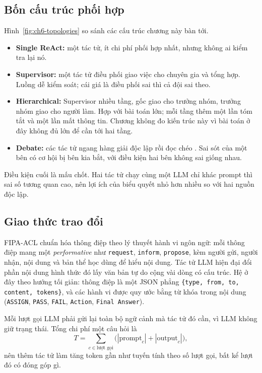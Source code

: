 \subsection{Bốn cấu trúc phối hợp}
Hình~\ref{fig:ch6-topologies} so sánh các cấu trúc chương này bàn tới.
\begin{itemize}
\item \textbf{Single ReAct:} một tác tử, ít chi phí phối hợp nhất, nhưng không ai kiểm tra lại nó.
\item \textbf{Supervisor:} một tác tử điều phối giao việc cho chuyên gia và tổng hợp. Luồng dễ kiểm soát; cái giá là điều phối sai thì cả đội sai theo.
\item \textbf{Hierarchical:} Supervisor nhiều tầng, gốc giao cho trưởng nhóm, trưởng nhóm giao cho người làm. Hợp với bài toán lớn; mỗi tầng thêm một lần tóm tắt và một lần mất thông tin. Chương không đo kiến trúc này vì bài toán ở đây không đủ lớn để cần tới hai tầng.
\item \textbf{Debate:} các tác tử ngang hàng giải độc lập rồi đọc chéo \cite{ch6du2023,ch6liang2023}. Sai sót của một bên có cơ hội bị bên kia bắt, với điều kiện hai bên không sai giống nhau.
\end{itemize}
Điều kiện cuối là mấu chốt. Hai tác tử chạy cùng một LLM chỉ khác prompt thì sai số tương quan cao, nên lợi ích của biểu quyết nhỏ hơn nhiều so với hai nguồn độc lập.


\subsection{Giao thức trao đổi}
FIPA-ACL \cite{ch6fipa2002} chuẩn hóa thông điệp theo lý thuyết hành vi ngôn ngữ: mỗi thông điệp mang một \emph{performative} như \texttt{request}, \texttt{inform}, \texttt{propose}, kèm người gửi, người nhận, nội dung và bản thể học dùng để hiểu nội dung. Tác tử LLM hiện đại đổi phần nội dung hình thức đó lấy văn bản tự do cộng vài dòng có cấu trúc. Hệ ở đây theo hướng tối giản: thông điệp là một JSON phẳng \texttt{\{type, from, to, content, tokens\}}, và các hành vi được quy ước bằng từ khóa trong nội dung (\texttt{ASSIGN}, \texttt{PASS}, \texttt{FAIL}, \texttt{Action}, \texttt{Final Answer}).

Mỗi lượt gọi LLM phải gửi lại toàn bộ ngữ cảnh mà tác tử đó cần, vì LLM không giữ trạng thái. Tổng chi phí một câu hỏi là
\begin{equation}
T=\sum_{c\in\text{lượt gọi}}\big(|\text{prompt}_c|+|\text{output}_c|\big),
\end{equation}
nên thêm tác tử làm tăng token gần như tuyến tính theo số lượt gọi, bất kể lượt đó có đóng góp gì.

